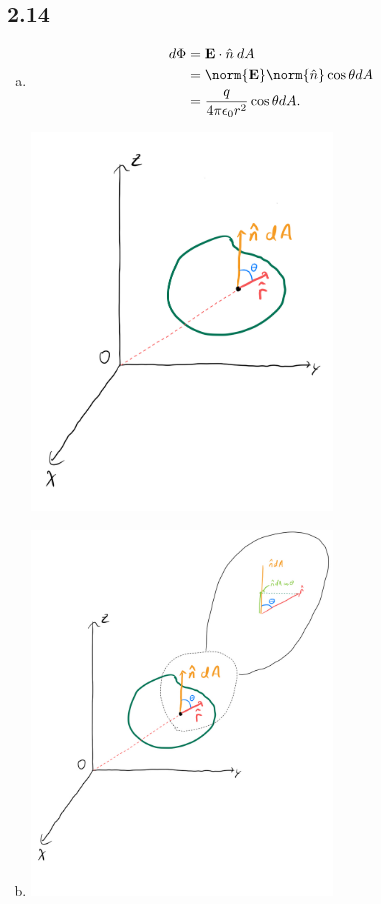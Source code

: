 \documentclass[10pt]{mypackage}
\begin{document}
\subsection{2.14}%
\begin{enumerate}[(a)]
  \item 
    \begin{align*}
      d\Phi &= \mathbf{E}\cdot \hat{n}\: dA\\
            &= \norm{\mathbf{E}}\norm{\hat{n}}\cos\theta dA\\
            &= \frac{q}{4\pi\epsilon_0 r^2}\cos\theta dA.
    \end{align*}
    \begin{center}
      \includegraphics[width=8cm]{images/p_1a_1_2-14a}
    \end{center}
    \item\hfill
      \begin{center}
        \includegraphics[width=8cm]{images/p_1a_1_2-14b}

\end{center}
\end{enumerate}
\end{document}
